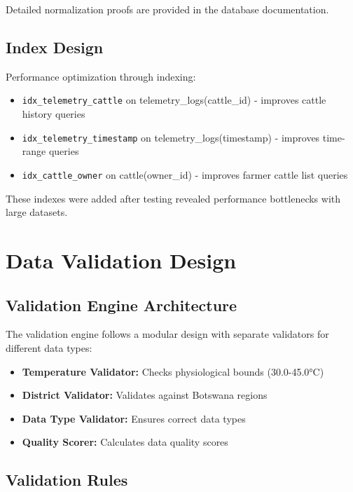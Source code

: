 Detailed normalization proofs are provided in the database documentation.

\subsection{Index Design}

Performance optimization through indexing:

\begin{itemize}
    \item \texttt{idx\_telemetry\_cattle} on telemetry\_logs(cattle\_id) - improves cattle history queries
    \item \texttt{idx\_telemetry\_timestamp} on telemetry\_logs(timestamp) - improves time-range queries
    \item \texttt{idx\_cattle\_owner} on cattle(owner\_id) - improves farmer cattle list queries
\end{itemize}

These indexes were added after testing revealed performance bottlenecks with large datasets.

\section{Data Validation Design}

\subsection{Validation Engine Architecture}

The validation engine follows a modular design with separate validators for different data types:

\begin{itemize}
    \item \textbf{Temperature Validator:} Checks physiological bounds (30.0-45.0°C)
    \item \textbf{District Validator:} Validates against Botswana regions
    \item \textbf{Data Type Validator:} Ensures correct data types
    \item \textbf{Quality Scorer:} Calculates data quality scores
\end{itemize}

\subsection{Validation Rules}

